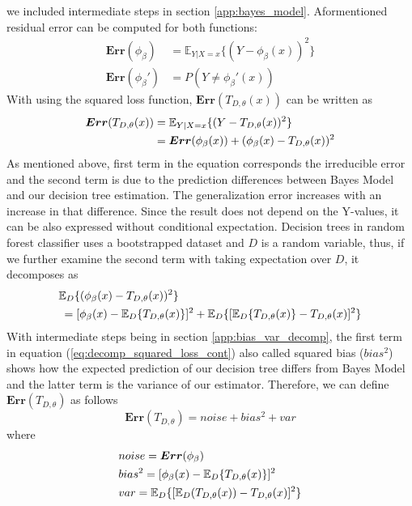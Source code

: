 we included intermediate steps in section \ref{app:bayes_model}. 
Aformentioned residual error can be computed for both functions:
\begin{align}
\boldsymbol{Err}(\phi_{\beta}) & = \mathbb{E}_{Y|X=x}\{(Y-\phi_{\beta}(x))^2 \}\\
\boldsymbol{Err}(\phi_{\beta}') & = P(Y \neq \phi_{\beta}'(x) )
\end{align}
With using the squared loss function, $\boldsymbol{Err}(T_{D,\theta}(x))$ can be written as
\begin{align}\label{eq:decomp_squared_loss}
\boldsymbol{Err}(T_{D, \theta}(x)) & = \mathbb{E}_{Y|X=x}\{(Y-T_{D,\theta}(x))^2\} \notag \\
							   	  & = \boldsymbol{Err}(\phi_{\beta}(x)) + (\phi_{\beta}(x)-T_{D,\theta}(x))^2
\end{align}
As mentioned above, first term in the equation corresponds the 
irreducible error and the second term is due to the prediction differences between Bayes Model and our decision tree estimation. 
The generalization error increases with an increase in that difference. Since the result does not depend on the Y-values, 
it can be also expressed without conditional expectation. Decision trees in random forest classifier uses a bootstrapped dataset 
and $D$ is a random variable, thus, if we further examine the second term with taking expectation over $D$, it decomposes as
\begin{align}\label{eq:decomp_squared_loss_cont}
	& \mathbb{E}_{D}\{(\phi_{\beta}(x) - T_{D,\theta}(x))^2 \} \notag \\
	& \: = [\phi_{\beta}(x) - \mathbb{E}_{D}\{T_{D,\theta}(x)\}]^2 + 
	\mathbb{E}_{D}\{[\mathbb{E}_{D}\{T_{D,\theta}(x)\} - T_{D,\theta}(x)]^2\}
\end{align}
With intermediate steps being in section \ref{app:bias_var_decomp}, 
the first term in equation (\ref{eq:decomp_squared_loss_cont}) also called squared bias ($bias^2$) shows how the expected prediction of our 
decision tree differs from Bayes Model and the latter term is the variance of our estimator. 
Therefore, we can define $\boldsymbol{Err}(T_{D,\theta})$ as follows
\begin{equation}
\boldsymbol{Err}(T_{D,\theta}) = noise + bias^2 + var
\end{equation}
\vspace{-3mm}
\qquad \qquad \qquad \quad where
\vspace{-6.3mm}
\begin{align}
& noise = \boldsymbol{Err}(\phi_{\beta}) \notag \\
& bias^2 = [\phi_{\beta}(x) - \mathbb{E}_{D}\{T_{D,\theta}(x)\}]^2 \notag \\
& var = \mathbb{E}_{D}\{[\mathbb{E}_{D}(T_{D,\theta}(x)) - T_{D,\theta}(x)]^2\} \notag
\end{align}
